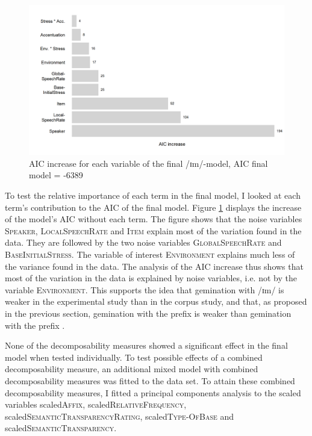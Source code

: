  









\begin{figure}[b!]
	\centering
	\includegraphics[scale=0.7]{images/Experiment/AICdecreaseImComplex.png}
	\caption{AIC increase for each variable of the final /ɪm/-model, AIC final model = -6389}
	\label{fig:Effectsize im experiment}
	
\end{figure}

To test the relative importance of each term in the final model, I looked at each term's contribution to the AIC of the final model. Figure \ref{fig:Effectsize im experiment} displays the increase of the model's AIC  without each term. 
The figure shows that the noise variables \textsc{Speaker}, \textsc{LocalSpeechRate} and \textsc{Item} explain  most of the variation found in the data. They are followed by the two noise variables \textsc{GlobalSpeechRate} and \textsc{BaseInitialStress}. The variable of interest \textsc{Environment} explains much less of the variance found in the data. The analysis of the AIC increase thus shows that most of the variation in the data is explained by noise variables, i.e. not by the variable \textsc{Environment}. This supports the idea that gemination with /ɪm/ is weaker in the experimental study than in the corpus study, and that, as proposed in the previous section, gemination with the prefix  is weaker than gemination with the prefix  . 




None of the decomposability measures showed a significant effect in the final model when tested individually. To test possible effects of a combined decomposability measure, an additional mixed model with combined decomposability measures was fitted to the data set.  
To attain these combined decomposability measures, I fitted a principal components analysis to the scaled variables scaled\textsc{Affix}, scaled\textsc{RelativeFrequency}, scaled\textsc{SemanticTransparencyRating}, scaled\textsc{Type-OfBase} and scaled\textsc{SemanticTransparency}.





